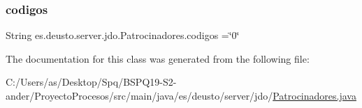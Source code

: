 \subsubsection{\texorpdfstring{codigos}{codigos}}
{\footnotesize\ttfamily String es.\+deusto.\+server.\+jdo.\+Patrocinadores.\+codigos =\char`\"{}0\char`\"{}\hspace{0.3cm}{\ttfamily [static]}}



The documentation for this class was generated from the following file\+:\begin{DoxyCompactItemize}
\item 
C\+:/\+Users/as/\+Desktop/\+Spq/\+B\+S\+P\+Q19-\/\+S2-\/ander/\+Proyecto\+Procesos/src/main/java/es/deusto/server/jdo/\mbox{\hyperlink{_patrocinadores_8java}{Patrocinadores.\+java}}\end{DoxyCompactItemize}
